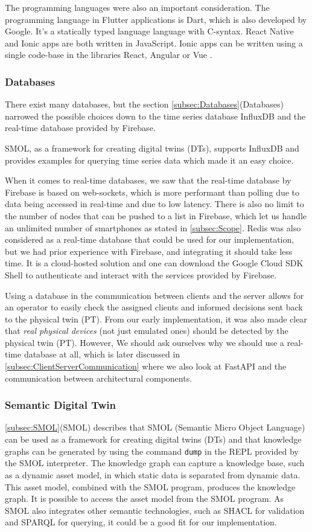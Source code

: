 \documentclass{article}
\begin{document}
The programming languages were also an important consideration. The programming language in Flutter applications is Dart, which is also developed by Google. It's a statically typed language language with C-syntax. React Native and Ionic apps are both written in JavaScript. Ionic apps can be written using a single code-base in the libraries React, Angular or Vue \cite{noauthor_ionic_nodate}.

\subsubsection{Databases}
There exist many databases, but the section \ref{subsec:Databases}(Databases) narrowed the possible choices down to the time series database InfluxDB and the real-time database provided by Firebase. 

SMOL, as a framework for creating digital twins (DTs), supports InfluxDB and provides examples for querying time series data which made it an easy choice. 

When it comes to real-time databases, we saw that the real-time database by Firebase is based on web-sockets, which is more performant than polling due to data being accessed in real-time and due to low latency. There is also no limit to the number of nodes that can be pushed to a list in Firebase, which let us handle an unlimited number of smartphones as stated in \ref{subsec:Scope}. Redis was also considered as a real-time database that could be used for our implementation, but we had prior experience with Firebase, and integrating it should take less time. It is a cloud-hosted solution \cite{noauthor_firebase_nodate} and one can download the Google Cloud SDK Shell to authenticate and interact with the services provided by Firebase.

Using a database in the communication between clients and the server allows for an operator to easily check the assigned clients and informed decisions sent back to the physical twin (PT). From our early implementation, it was also made clear that \emph{real physical devices} (not just emulated ones) should be detected by the physical twin (PT). However, We should ask ourselves why we should use a real-time database at all, which is later discussed in \ref{subsec:ClientServerCommunication} where we also look at FastAPI and the communication between architectural components. 

\subsubsection{Semantic Digital Twin}
\ref{subsec:SMOL}(SMOL) describes that SMOL (Semantic Micro Object Language) can be used as a framework for creating digital twins (DTs) and that knowledge graphs can be generated by using the command \verb|dump| in the REPL provided by the SMOL interpreter. The knowledge graph can capture a knowledge base, such as a dynamic asset model, in which static data is separated from dynamic data. This asset model, combined with the SMOL program, produces the knowledge graph. It is possible to access the asset model from the SMOL program. As SMOL also integrates other semantic technologies, such as SHACL for validation and SPARQL for querying, it could be a good fit for our implementation.
\end{document}
